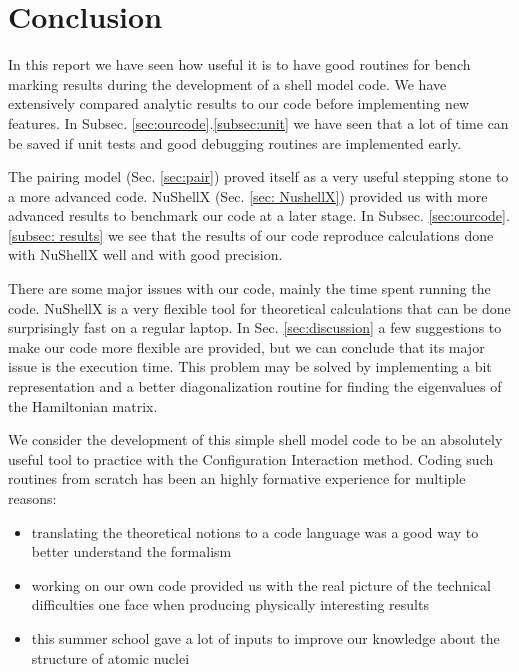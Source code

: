 \documentclass[twoside]{article}
\begin{document}
\newpage

\section{Conclusion}
\label{sec:summary}


In this report we have seen how useful it is to have good routines for bench marking results during the development of a shell model code. We have extensively compared analytic results to our code before implementing new features. In Subsec. \ref{sec:ourcode}.\ref{subsec:unit} we have seen that a lot of time can be saved if unit tests and good debugging routines are implemented early. 

The pairing model (Sec. \ref{sec:pair}) proved itself as a very useful stepping stone to a more advanced code. NuShellX (Sec. \ref{sec: NushellX}) provided us with more advanced results to benchmark our code at a later stage. In Subsec. \ref{sec:ourcode}.\ref{subsec: results} we see that the results of our code reproduce calculations done with NuShellX well and with good precision.

There are some major issues with our code, mainly the time spent running the code. NuShellX is a very flexible tool for theoretical calculations that can be done surprisingly fast on a regular laptop.  In Sec. \ref{sec:discussion} a few suggestions to make our code more flexible are provided, but we can conclude that its major issue is the execution time. This problem may be solved by implementing a bit representation and a better diagonalization routine for finding the eigenvalues of the Hamiltonian matrix.

We consider the development of this simple shell model code to be an absolutely useful tool to practice with the Configuration Interaction method. Coding such routines from scratch has been an highly formative experience for multiple reasons:
\begin{itemize} 
\item translating the theoretical notions to a code language was a good way to better understand the formalism 
\item working on our own code provided us with the real picture of the technical difficulties one face when producing physically interesting results
\item this summer school \cite{ref: git_school} gave a lot of inputs to improve our knowledge about the structure of atomic nuclei
\end{itemize}
\end{document}
